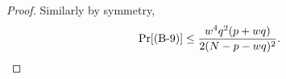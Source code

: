 \begin{proof}
	Similarly by symmetry,
	\begin{align*}
	\Pr[\text{(B-9)}] 
	\leq
	\frac{w^4q^2(p+wq)}{2(N-p-wq)^2}.
	\end{align*}
	
	
	

\end{proof}
